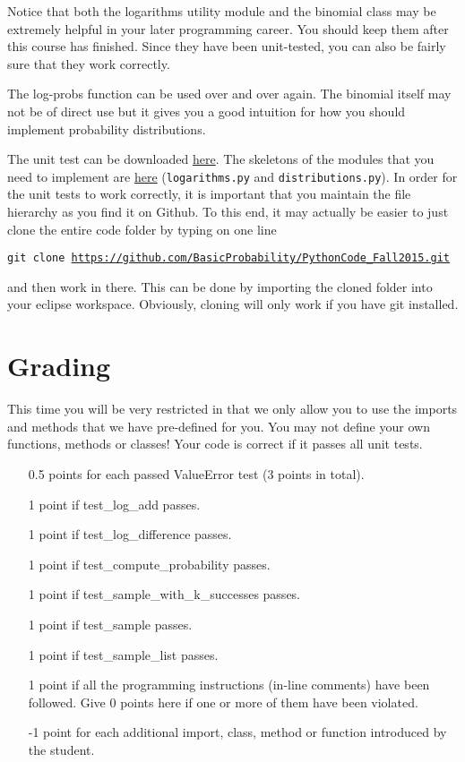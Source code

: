 \documentclass[11pt, leqno, a4paper]{article}
\begin{document}
Notice that both the logarithms utility module and the binomial class may be extremely helpful in your later
programming career. You should keep them after this course has finished. Since they have been unit-tested,
you can also be fairly sure that they work correctly.

The log-probs function can be used over and over again. The binomial itself may not be of direct use but
it gives you a good intuition for how you should implement probability distributions.

The unit test can be downloaded 
\href{https://github.com/BasicProbability/PythonCode_Fall2015/tree/master/test/week4_debugging_and_testing}{here}. The skeletons of the modules that you need to implement are 
\href{https://github.com/BasicProbability/PythonCode_Fall2015/tree/master/src/week4_debugging_and_testing}{here} (\texttt{logarithms.py} and \texttt{distributions.py}). In order for the unit tests to work correctly, it is important that you maintain the file
hierarchy as you find it on Github. To this end, it may actually be easier to just clone the entire 
code folder by typing on one line
\begin{center}
\texttt{git clone \url{https://github.com/BasicProbability/PythonCode_Fall2015.git}}
\end{center}
and then work in there. This can be done by importing the cloned folder into your eclipse workspace.
Obviously, cloning will only work if you have git installed.

\section{Grading}
This time you will be very restricted in that we only allow you to use the imports and methods that
we have pre-defined for you. You may not define your own functions, methods or classes! Your code
is correct if it passes all unit tests.

\begin{itemize}
\item[0.5 points] for each passed ValueError test (3 points in total).
\item[1 point] if test\_log\_add passes.
\item[1 point] if test\_log\_difference passes.
\item[1 point] if test\_compute\_probability passes.
\item[1 point] if test\_sample\_with\_k\_successes passes.
\item[1 point] if test\_sample passes.
\item[1 point] if test\_sample\_list passes.
\item[1 point] if all the programming instructions (in-line comments) have been followed. Give 0 points here
if one or more of them have been violated.
\item[-1 point] for each additional import, class, method or function introduced by the student.
\end{itemize} 
\end{document}
